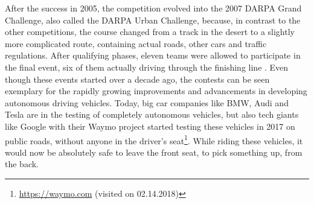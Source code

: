 After the success in 2005, the competition evolved into the 2007 DARPA Grand Challenge, also called the DARPA Urban Challenge, because, in contrast to the other competitions, the course changed from a track in the desert to a slightly more complicated route, containing actual roads, other cars and traffic regulations. After qualifying phases, eleven teams were allowed to participate in the final event, six of them actually driving through the finishing line \cite{darpa2007}.\newline
Even though these events started over a decade ago, 
the contests can be seen exemplary for the rapidly growing improvements and advancements in developing autonomous driving vehicles. Today, big car companies like BMW, Audi and Tesla are in the testing of completely autonomous vehicles, but also tech giants like Google with their Waymo project started testing these vehicles in 2017 on public roads, without anyone in the driver's seat\footnote{\url{https://waymo.com} (visited on 02.14.2018)}. While riding these vehicles, it would now be absolutely safe to leave the front seat, to pick something up, from the back. 